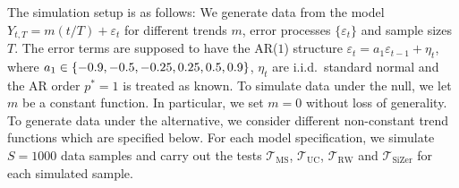 The simulation setup is as follows: We generate data from the model $Y_{t,T} = m(t/T) + \varepsilon_t$ for different trends $m$, error processes $\{\varepsilon_t\}$ and sample sizes $T$. The error terms are supposed to have the AR($1$) structure $\varepsilon_t = a_1 \varepsilon_{t-1} + \eta_t$, where $a_1 \in \{-0.9,-0.5,-0.25, \linebreak 0.25,0.5,0.9\}$, $\eta_t$ are i.i.d.\ standard normal and the AR order $p^*=1$ is treated as known. To simulate data under the null, we let $m$ be a constant function. In particular, we set $m = 0$ without loss of generality. To generate data under the alternative, we consider different non-constant trend functions which are specified below. For each model specification, we simulate $S=1000$ data samples and carry out the tests $\mathcal{T}_{\text{MS}}$, $\mathcal{T}_{\text{UC}}$, $\mathcal{T}_{\text{RW}}$ and $\mathcal{T}_{\text{SiZer}}$ for each simulated sample. 



